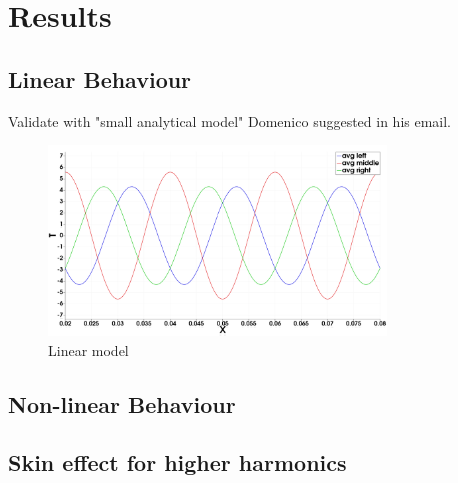 \chapter{Results} \label{sec:results}

\section{Linear Behaviour}
Validate with "small analytical model" Domenico suggested in his email.

\begin{figure}[ht!]
    \centering
    \includegraphics[width=0.8\textwidth]{img/B_phase_plot_linear_mu.png}
    \caption{Linear model}
    \label{fig:linear_model}
\end{figure}

\section{Non-linear Behaviour}

\section{Skin effect for higher harmonics}

